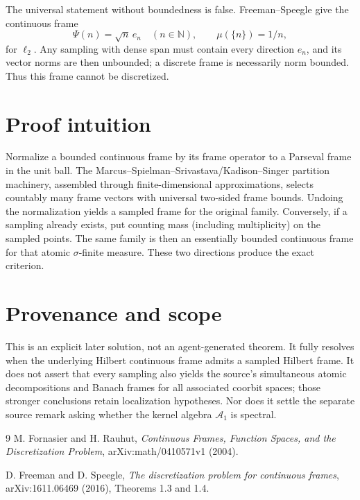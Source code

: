 \documentclass[11pt]{article}
\begin{document}
The universal statement without boundedness is false.  Freeman--Speegle give the continuous frame
\[
 \Psi(n)=\sqrt n\,e_n\quad(n\in\mathbb N),
 \qquad \mu(\{n\})=1/n,
\]
for $\ell_2$.  Any sampling with dense span must contain every direction $e_n$, and its vector norms are then unbounded; a discrete frame is necessarily norm bounded.  Thus this frame cannot be discretized.

\section*{Proof intuition}
Normalize a bounded continuous frame by its frame operator to a Parseval frame in the unit ball.  The Marcus--Spielman--Srivastava/Kadison--Singer partition machinery, assembled through finite-dimensional approximations, selects countably many frame vectors with universal two-sided frame bounds.  Undoing the normalization yields a sampled frame for the original family.  Conversely, if a sampling already exists, put counting mass (including multiplicity) on the sampled points.  The same family is then an essentially bounded continuous frame for that atomic $\sigma$-finite measure.  These two directions produce the exact criterion.

\section*{Provenance and scope}
This is an explicit later solution, not an agent-generated theorem.  It fully resolves when the underlying Hilbert continuous frame admits a sampled Hilbert frame.  It does not assert that every sampling also yields the source's simultaneous atomic decompositions and Banach frames for all associated coorbit spaces; those stronger conclusions retain localization hypotheses.  Nor does it settle the separate source remark asking whether the kernel algebra $\mathcal A_1$ is spectral.

{\raggedright
\begin{thebibliography}{9}
M. Fornasier and H. Rauhut,
\emph{Continuous Frames, Function Spaces, and the Discretization Problem},
arXiv:math/0410571v1 (2004).

D. Freeman and D. Speegle,
\emph{The discretization problem for continuous frames},
arXiv:1611.06469 (2016), Theorems 1.3 and 1.4.
\end{thebibliography}
\par}
\end{document}
